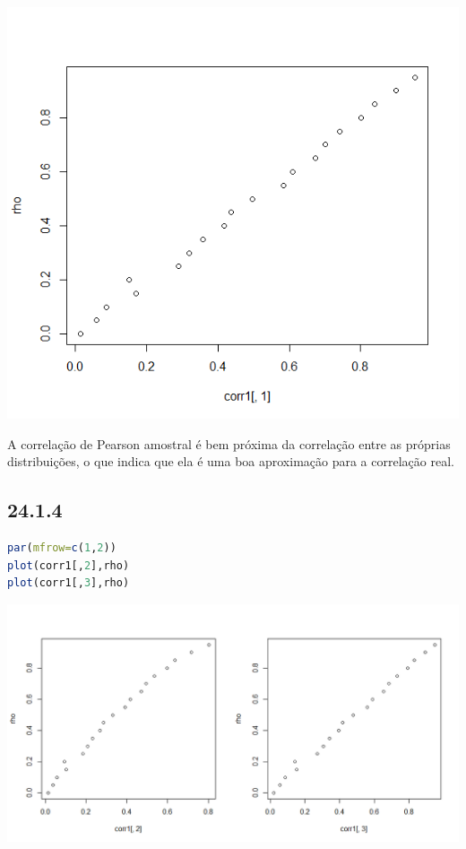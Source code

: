 \documentclass[12pt]{article}
\begin{document}
\begin{center}
\includegraphics*[scale=0.8]{1.png}
\end{center}

A correlação de Pearson amostral é bem próxima da correlação entre as próprias distribuições, o que indica que ela é uma boa aproximação para a correlação real.

\subsection*{24.1.4}

\begin{lstlisting}[language=R]
par(mfrow=c(1,2))
plot(corr1[,2],rho)
plot(corr1[,3],rho)
\end{lstlisting}

\includegraphics*[scale=0.6]{2.png}
\end{document}
